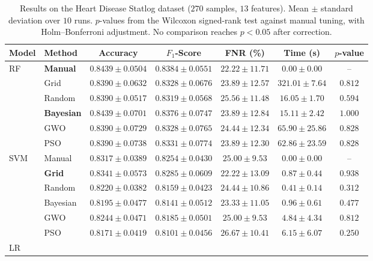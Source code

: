 \documentclass[letterpaper, 10 pt, conference]{ieeeconf}
\begin{document}
\begin{table}[t]
	\caption{Results on the Heart Disease Statlog dataset ($270$ samples, $13$ features). Mean $\pm$ standard deviation over $10$ runs. $p$-values from the Wilcoxon signed-rank test against manual tuning, with Holm--Bonferroni adjustment. No comparison reaches $p < 0.05$ after correction.}
	\label{tab:hd_results}
	\centering
	\scriptsize
	\begin{tabular}{|l|l|c|c|c|c|c|}
		\hline
		\textbf{Model} & \textbf{Method} & \textbf{Accuracy} & \textbf{$F_1$-Score} & \textbf{FNR (\%)} & \textbf{Time (s)} & \textbf{$p$-value} \\
		\hline
		\multirow{6}{*}{RF}
		& \textbf{Manual}   & $\mathbf{0.8439 \pm 0.0504}$ & $\mathbf{0.8384 \pm 0.0551}$ & $\mathbf{22.22 \pm 11.71}$ & $0.00 \pm 0.00$ & -- \\
		& Grid     & $0.8390 \pm 0.0632$ & $0.8328 \pm 0.0676$ & $23.89 \pm 12.57$ & $321.01 \pm 7.64$ & $0.812$ \\
		& Random   & $0.8390 \pm 0.0517$ & $0.8319 \pm 0.0568$ & $25.56 \pm 11.48$ & $16.05 \pm 1.70$ & $0.594$ \\
		& \textbf{Bayesian} & $\mathbf{0.8439 \pm 0.0701}$ & $0.8376 \pm 0.0747$ & $23.89 \pm 12.84$ & $15.11 \pm 2.42$ & $1.000$ \\
		& GWO      & $0.8390 \pm 0.0729$ & $0.8328 \pm 0.0765$ & $24.44 \pm 12.34$ & $65.90 \pm 25.86$ & $0.828$ \\
		& PSO      & $0.8390 \pm 0.0738$ & $0.8331 \pm 0.0774$ & $23.89 \pm 12.30$ & $62.86 \pm 23.59$ & $0.828$ \\
		\hline
		\multirow{6}{*}{SVM}
		& Manual   & $0.8317 \pm 0.0389$ & $0.8254 \pm 0.0430$ & $25.00 \pm 9.53$ & $0.00 \pm 0.00$ & -- \\
		& \textbf{Grid}     & $\mathbf{0.8341 \pm 0.0573}$ & $\mathbf{0.8285 \pm 0.0609}$ & $\mathbf{22.22 \pm 13.09}$ & $0.87 \pm 0.44$ & $0.938$ \\
		& Random   & $0.8220 \pm 0.0382$ & $0.8159 \pm 0.0423$ & $24.44 \pm 10.86$ & $0.41 \pm 0.14$ & $0.312$ \\
		& Bayesian & $0.8195 \pm 0.0477$ & $0.8141 \pm 0.0512$ & $23.33 \pm 11.05$ & $0.96 \pm 0.61$ & $0.477$ \\
		& GWO      & $0.8244 \pm 0.0471$ & $0.8185 \pm 0.0501$ & $25.00 \pm 9.53$ & $4.84 \pm 4.34$ & $0.812$ \\
		& PSO      & $0.8171 \pm 0.0419$ & $0.8101 \pm 0.0456$ & $26.67 \pm 10.41$ & $6.15 \pm 6.07$ & $0.250$ \\
		\hline
		\multirow{6}{*}{LR}

\end{tabular}
\end{table}
\end{document}
